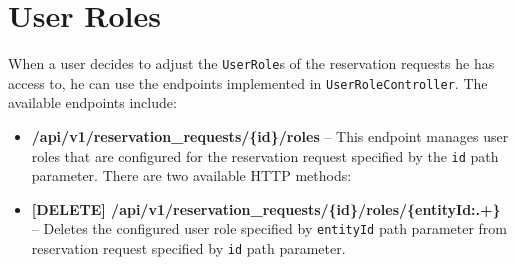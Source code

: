 \section{User Roles}
When a user decides to adjust the \texttt{UserRole}s of the reservation requests he has access to, he can use the endpoints implemented in \texttt{UserRoleController}.
The available endpoints include:
\begin{itemize}
    \item \textbf{/api/v1/reservation\_requests/\{id\}/roles} -- This endpoint manages user roles that are configured for the reservation request specified by the \texttt{id} path parameter. There are two available HTTP methods:
    \item \textbf{[DELETE] /api/v1/reservation\_requests/\{id\}/roles/\{entityId:.+\}} -- Deletes the configured user role specified by \texttt{entityId} path parameter from reservation request specified by \texttt{id} path parameter.
\end{itemize}
